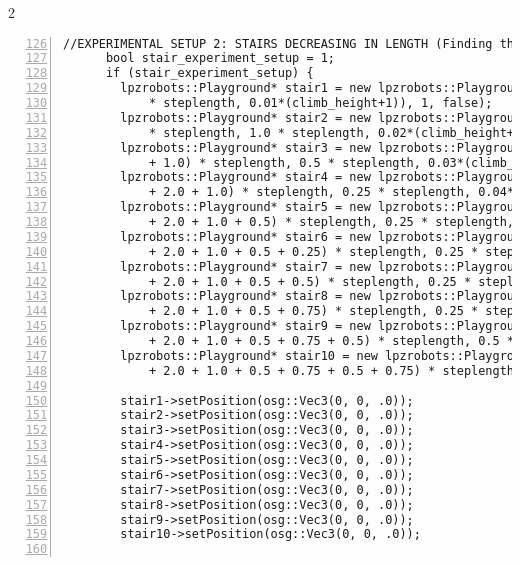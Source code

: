 \documentclass[a3, 14pt]{sciposter}
\begin{document}
\begin{multicols}{2}
\begin{lstlisting}[numbers = left, firstnumber = 126]
      //EXPERIMENTAL SETUP 2: STAIRS DECREASING IN LENGTH (Finding the minimal step length x which AMOS is able to negotiate)
      bool stair_experiment_setup = 1;
      if (stair_experiment_setup) {
        lpzrobots::Playground* stair1 = new lpzrobots::Playground(playgroundHandle, osgHandle, osg::Vec3(2.0, 2.0
            * steplength, 0.01*(climb_height+1)), 1, false);
        lpzrobots::Playground* stair2 = new lpzrobots::Playground(playgroundHandle, osgHandle, osg::Vec3(2.0 + 2.0
            * steplength, 1.0 * steplength, 0.02*(climb_height+1)), 1, false);
        lpzrobots::Playground* stair3 = new lpzrobots::Playground(playgroundHandle, osgHandle, osg::Vec3(2.0 + (2.0
            + 1.0) * steplength, 0.5 * steplength, 0.03*(climb_height+1)), 1, false);
        lpzrobots::Playground* stair4 = new lpzrobots::Playground(playgroundHandle, osgHandle, osg::Vec3(2.0 + (0.5
            + 2.0 + 1.0) * steplength, 0.25 * steplength, 0.04*(climb_height+1)), 1, false);
        lpzrobots::Playground* stair5 = new lpzrobots::Playground(playgroundHandle, osgHandle, osg::Vec3(2.0 + (0.25
            + 2.0 + 1.0 + 0.5) * steplength, 0.25 * steplength, 0.05*(climb_height+1)), 1, false);
        lpzrobots::Playground* stair6 = new lpzrobots::Playground(playgroundHandle, osgHandle, osg::Vec3(2.0 + (0.25
            + 2.0 + 1.0 + 0.5 + 0.25) * steplength, 0.25 * steplength, 0.06*(climb_height+1)), 1, false);
        lpzrobots::Playground* stair7 = new lpzrobots::Playground(playgroundHandle, osgHandle, osg::Vec3(2.0 + (0.25
            + 2.0 + 1.0 + 0.5 + 0.5) * steplength, 0.25 * steplength, 0.07*(climb_height+1)), 1, false);
        lpzrobots::Playground* stair8 = new lpzrobots::Playground(playgroundHandle, osgHandle, osg::Vec3(2.0 + (0.25
            + 2.0 + 1.0 + 0.5 + 0.75) * steplength, 0.25 * steplength, 0.08*(climb_height+1)), 1, false);
        lpzrobots::Playground* stair9 = new lpzrobots::Playground(playgroundHandle, osgHandle, osg::Vec3(2.0 + (0.25
            + 2.0 + 1.0 + 0.5 + 0.75 + 0.5) * steplength, 0.5 * steplength, 0.09*(climb_height+1)), 1, false);
        lpzrobots::Playground* stair10 = new lpzrobots::Playground(playgroundHandle, osgHandle, osg::Vec3(2.0 + (0.25
            + 2.0 + 1.0 + 0.5 + 0.75 + 0.5 + 0.75) * steplength, 2.0 * steplength, 0.1*(climb_height+1)), 1, false);

        stair1->setPosition(osg::Vec3(0, 0, .0));
        stair2->setPosition(osg::Vec3(0, 0, .0));
        stair3->setPosition(osg::Vec3(0, 0, .0));
        stair4->setPosition(osg::Vec3(0, 0, .0));
        stair5->setPosition(osg::Vec3(0, 0, .0));
        stair6->setPosition(osg::Vec3(0, 0, .0));
        stair7->setPosition(osg::Vec3(0, 0, .0));
        stair8->setPosition(osg::Vec3(0, 0, .0));
        stair9->setPosition(osg::Vec3(0, 0, .0));
        stair10->setPosition(osg::Vec3(0, 0, .0));


\end{lstlisting}
\end{multicols}
\end{document}
